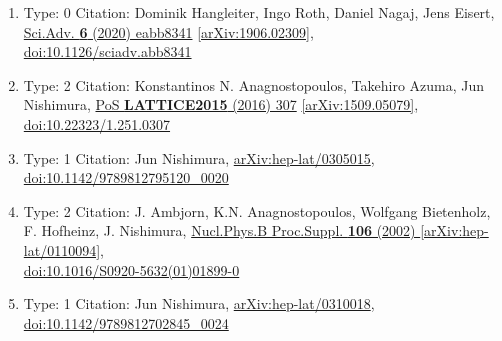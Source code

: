\documentclass[a4paper,10pt]{article}
\begin{document}
\begin{enumerate}
\begin{enumerate}
  \item Type: 0 Citation: Dominik Hangleiter, Ingo Roth, Daniel Nagaj, Jens Eisert, \href{https://www.doi.org/10.1126/sciadv.abb8341}{Sci.Adv. {\bf 6} (2020) eabb8341}  \href{https://arxiv.org/abs/1906.02309}{[arXiv:1906.02309]},\\\href{https://www.doi.org/10.1126/sciadv.abb8341}{doi:10.1126/sciadv.abb8341}
  \item Type: 2 Citation: Konstantinos N. Anagnostopoulos, Takehiro Azuma, Jun Nishimura, \href{https://www.doi.org/10.22323/1.251.0307}{PoS {\bf LATTICE2015} (2016) 307}  \href{https://arxiv.org/abs/1509.05079}{[arXiv:1509.05079]},\\\href{https://www.doi.org/10.22323/1.251.0307}{doi:10.22323/1.251.0307}
  \item Type: 1 Citation: Jun Nishimura, \href{https://arxiv.org/abs/hep-lat/0305015}{arXiv:hep-lat/0305015},\\\href{https://www.doi.org/10.1142/9789812795120_0020}{doi:10.1142/9789812795120\_0020}
  \item Type: 2 Citation: J. Ambjorn, K.N. Anagnostopoulos, Wolfgang Bietenholz, F. Hofheinz, J. Nishimura, \href{https://www.doi.org/10.1016/S0920-5632(01)01899-0}{Nucl.Phys.B Proc.Suppl. {\bf 106} (2002) }  \href{https://arxiv.org/abs/hep-lat/0110094}{[arXiv:hep-lat/0110094]},\\\href{https://www.doi.org/10.1016/S0920-5632(01)01899-0}{doi:10.1016/S0920-5632(01)01899-0}
  \item Type: 1 Citation: Jun Nishimura, \href{https://arxiv.org/abs/hep-lat/0310018}{arXiv:hep-lat/0310018},\\\href{https://www.doi.org/10.1142/9789812702845_0024}{doi:10.1142/9789812702845\_0024}

\end{enumerate}
\end{enumerate}
\end{document}
